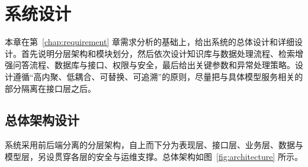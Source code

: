 \chapter{系统设计}
\label{chap:design}

本章在第~\ref{chap:requirement} 章需求分析的基础上，给出系统的总体设计和详细设计。首先说明分层架构和模块划分，然后依次设计知识库与数据处理流程、检索增强问答流程、数据库与接口、权限与安全，最后给出关键参数和异常处理策略。设计遵循“高内聚、低耦合、可替换、可追溯”的原则，尽量把与具体模型服务相关的部分隔离在接口层之后。

\section{总体架构设计}
\label{sec:architecture}

系统采用前后端分离的分层架构，自上而下分为表现层、接口层、业务层、数据与模型层，另设贯穿各层的安全与运维支撑。总体架构如图~\ref{fig:architecture} 所示。


